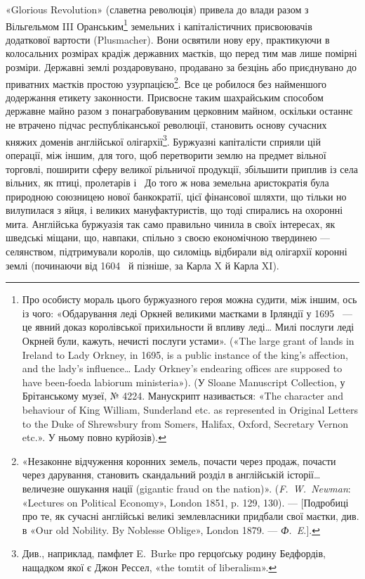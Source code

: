 «Glorious Revolution» (славетна революція) привела до влади
разом з Вільгельмом III Оранським\footnote{
Про особисту мораль цього буржуазного героя можна судити,
між іншим, ось із чого: «Обдарування леді Оркней великими маєтками
в Ірляндії у 1695~ — це явний доказ королівської прихильности й впливу
леді\dots{} Милі послуги леді Окрней були, кажуть, нечисті послуги устами».
(«The large grant of lands in Ireland to Lady Orkney, in 1695, is a public
instance of the king’s affection, and the lady’s influence\dots{} Lady Orkney’s
endearing offices are supposed to have been-foeda labiorum ministeria»).
(У Sloane Manuscript Collection, у Брітанському музеї, № 4224.
Манускрипт називається: «The character and behaviour of King William,
Sunderland etc. as represented in Original Letters to the Duke of
Shrewsbury from Somers, Halifax, Oxford, Secretary Vernon etc.». У ньому
повно курйозів).
} земельних і капіталістичних
присвоювачів додаткової вартости (Plusmacher). Вони освятили
нову еру, практикуючи в колосальних розмірах крадіж
державних маєтків, що перед тим мав лише помірні розміри.
Державні землі роздаровувано, продавано за безцінь або приєднувано
до приватних маєтків простою узурпацією\footnote{
«Незаконне відчуження коронних земель, почасти через продаж,
почасти через дарування, становить скандальний розділ в англійській
історії\dots{} величезне ошукання нації (gigantic fraud on the nation)».
(\emph{F.~W.~Newman}: «Lectures on Political Economy», London 1851, p. 129,
130). — [Подробиці про те, як сучасні англійські великі землевласники
придбали свої маєтки, див. в «Our old Nobility. By Noblesse Oblige», London
1879. — \emph{Ф.~E.}].
}. Все це
робилося без найменшого додержання етикету законности. Присвоєне
таким шахрайським способом державне майно разом з
понаграбовуваним церковним майном, оскільки останнє не втрачено
підчас республіканської революції, становить основу сучасних
княжих доменів англійської олігархії\footnote{
Див., наприклад, памфлет E.~Burke про герцоґську родину
Бедфордів, нащадком якої є Джон Рессел, «the tomtit of liberalism».
}. Буржуазні
капіталісти сприяли цій операції, між іншим, для того, щоб
перетворити землю на предмет вільної торговлі, поширити сферу
великої рільничої продукції, збільшити приплив із села вільних,
як птиці, пролетарів і~ До того ж нова земельна аристократія
була природною союзницею нової банкократії, цієї фінансової
шляхти, що тільки но вилупилася з яйця, і великих мануфактуристів,
що тоді спирались на охоронні мита. Англійська буржуазія
так само правильно чинила в своїх інтересах, як шведські
міщани, що, навпаки, спільно з своєю економічною твердинею
— селянством, підтримували королів, що силоміць відбирали
від олігархії коронні землі (починаючи від 1604~ й
пізніше, за Карла X й Карла XI).

